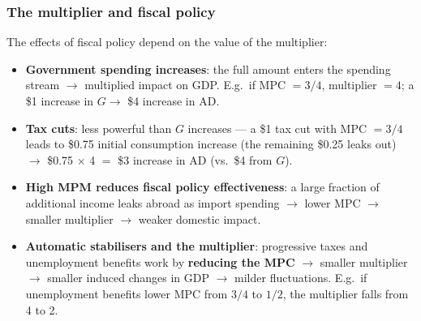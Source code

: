 \documentclass[a4paper,12pt]{article}
\begin{document}
\subsubsection*{The multiplier and fiscal policy}
The effects of fiscal policy depend on the value of the multiplier:
\begin{itemize}
  \item \textbf{Government spending increases}: the full amount enters the spending stream $\to$ multiplied impact on GDP. E.g.\ if MPC $= 3/4$, multiplier $= 4$; a \$1 increase in $G \to$ \$4 increase in AD.
  \item \textbf{Tax cuts}: less powerful than $G$ increases --- a \$1 tax cut with MPC $= 3/4$ leads to \$0.75 initial consumption increase (the remaining \$0.25 leaks out) $\to$ \$0.75 $\times$ 4 $=$ \$3 increase in AD (vs.\ \$4 from $G$).
  \item \textbf{High MPM reduces fiscal policy effectiveness}: a large fraction of additional income leaks abroad as import spending $\to$ lower MPC $\to$ smaller multiplier $\to$ weaker domestic impact.
  \item \textbf{Automatic stabilisers and the multiplier}: progressive taxes and unemployment benefits work by \textbf{reducing the MPC} $\to$ smaller multiplier $\to$ smaller induced changes in GDP $\to$ milder fluctuations. E.g.\ if unemployment benefits lower MPC from $3/4$ to $1/2$, the multiplier falls from 4 to 2.
\end{itemize}
\end{document}

